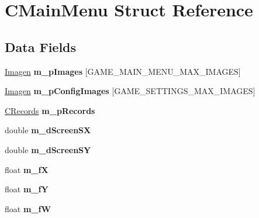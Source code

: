 \hypertarget{struct_c_main_menu}{}\section{C\+Main\+Menu Struct Reference}
\label{struct_c_main_menu}
\subsection*{Data Fields}
\begin{DoxyCompactItemize}
\item 
\mbox{\label{struct_c_main_menu_a905fecb5bcede77a7250b1cd3aa038a5}} 
\hyperlink{struct_imagen}{Imagen} {\bfseries m\+\_\+p\+Images} \mbox{[}G\+A\+M\+E\+\_\+\+M\+A\+I\+N\+\_\+\+M\+E\+N\+U\+\_\+\+M\+A\+X\+\_\+\+I\+M\+A\+G\+ES\mbox{]}
\item 
\mbox{\label{struct_c_main_menu_a5a7eb99d18e9e12c33a8a667b70fafca}} 
\hyperlink{struct_imagen}{Imagen} {\bfseries m\+\_\+p\+Config\+Images} \mbox{[}G\+A\+M\+E\+\_\+\+S\+E\+T\+T\+I\+N\+G\+S\+\_\+\+M\+A\+X\+\_\+\+I\+M\+A\+G\+ES\mbox{]}
\item 
\mbox{\label{struct_c_main_menu_a6b5ffe2b1ba2dc5397f17b3cc70a36a8}} 
\hyperlink{struct_c_records}{C\+Records} {\bfseries m\+\_\+p\+Records}
\item 
\mbox{\label{struct_c_main_menu_ab5c604c0b661dd13afcc71d0f22500d9}} 
double {\bfseries m\+\_\+d\+Screen\+SX}
\item 
\mbox{\label{struct_c_main_menu_a7b352b316818225866220ed4ce5e9d14}} 
double {\bfseries m\+\_\+d\+Screen\+SY}
\item 
\mbox{\label{struct_c_main_menu_a221d126aa350ad923c9379eee7a1fa8f}} 
float {\bfseries m\+\_\+fX}
\item 
\mbox{\label{struct_c_main_menu_a9275f65862bc85be57c9748f2c11ebb5}} 
float {\bfseries m\+\_\+fY}
\item 
\mbox{\label{struct_c_main_menu_a7f3ca769df4efa09a1d5b1104c582f31}} 
float {\bfseries m\+\_\+fW}
\item 

\end{DoxyCompactItemize}
